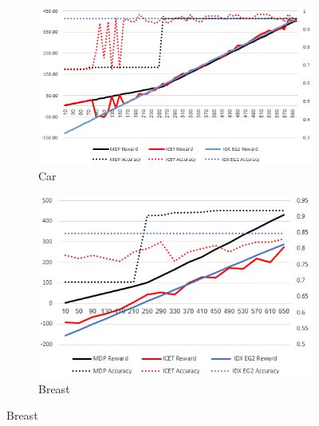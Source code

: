 \documentclass[letterpaper]{article}
\theoremstyle{definition}
\begin{document}
\begin{figure}[ht]
	\centering
	\begin{subfigure}[t]{0.45\textwidth}\vskip 0pt
		\centering
		\includegraphics[scale=0.5]{Car}
		\caption{Car}\label{fig:Car}		
	\end{subfigure}
    \quad
      \begin{subfigure}[t]{0.45\textwidth}\vskip 0pt
		\centering
		\includegraphics[scale=0.5]{Breast}
		\caption{Breast}\label{fig:Breast}		
	\end{subfigure}
    \quad
    

\end{figure}
\end{document}
